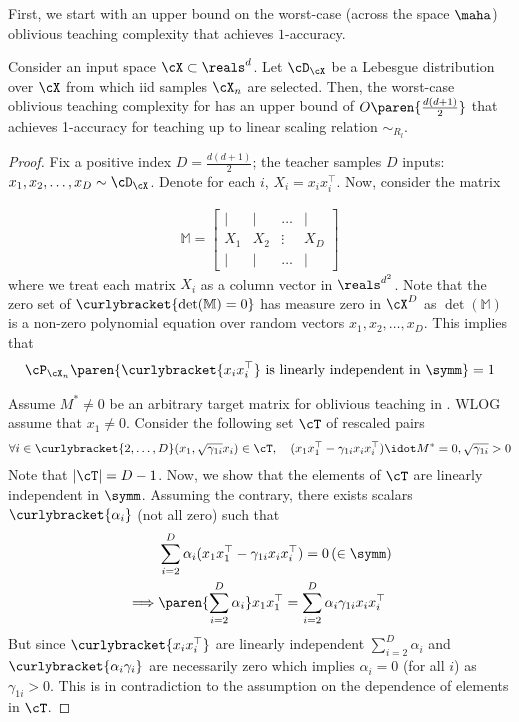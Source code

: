 First, we start with an upper bound on the worst-case (across the space $\maha$) oblivious teaching complexity that achieves $1$-accuracy.

\begin{proposition}
    Consider an input space $\cX \subset \reals^d$. Let $\cD_{\cX}$ be a Lebesgue distribution over $\cX$ from which iid samples $\cX_n$ are selected. Then, the worst-case oblivious teaching complexity for  has an upper bound of $O\paren{\frac{d(d+1)}{2}}$ that achieves 1-accuracy for teaching up to linear scaling relation $\sim_{R_l}$.
\end{proposition}
\begin{proof}
    
    Fix a positive index $D = \frac{d(d+1)}{2}$; the teacher samples $D$ inputs: $x_1,x_2,\ldots, x_{D} \sim \cD_{\cX}$. Denote for each $i$, $X_i = x_ix_i^{\top}$. Now, consider the matrix

        \begin{align*}
    \mathbb{M} = \begin{bmatrix}
  \Big\lvert & \Big\lvert& \ldots & \Big\lvert \\
  X_1 & X_2 & \vdots & X_D\\
  \Big\lvert& \Big\lvert& \ldots & \Big\lvert
\end{bmatrix}
\end{align*}
where we treat each matrix $X_i$ as a column vector in $\reals^{d^2}$. Note that the zero set of $\curlybracket{\det(\mathbb{M}) = 0}$ has measure zero in $\cX^D$ as $\det(\mathbb{M})$ is a non-zero polynomial equation over random vectors $x_1,x_2,\ldots, x_{D}$. This implies that
\begin{align}
    \cP_{\cX_n}\paren{\curlybracket{x_ix_i^{\top}} \textnormal{ is linearly independent in } \symm} = 1 \label{eq: fullprob}
\end{align}

Assume $M^* \neq 0$ be an arbitrary target matrix for oblivious teaching in . WLOG assume that $x_1 \neq 0$. Consider the following set $\cT$ of rescaled pairs
\begin{align*}
    \forall i \in \curlybracket{2,\ldots, D} (x_1, \sqrt{\gamma_{1i}}x_i) \in \cT,\quad (x_1x_1^{\top} - \gamma_{1i}x_ix_i^{\top}) \idot M^* = 0, \sqrt{\gamma_{1i}} > 0
\end{align*}
Note that $|\cT| = D - 1$. Now, we show that the elements of $\cT$ are linearly independent in $\symm$. Assuming the contrary, there exists scalars $\curlybracket{\alpha_i}$ (not all zero) such that
\begin{align*}
    &\sum_{i = 2}^D \alpha_i (x_1x_1^{\top} - \gamma_{1i}x_ix_i^{\top}) = 0 \,(\in \symm)\\
    \implies &\paren{\sum_{i = 2}^D \alpha_i} x_1x_1^{\top} = \sum_{i = 2}^D \alpha_i \gamma_{1i}x_ix_i^{\top}
\end{align*}
But since $\curlybracket{x_ix_i^{\top}}$ are linearly independent $\sum_{i = 2}^D \alpha_i$ and $\curlybracket{\alpha_i\gamma_i}$ are necessarily zero which implies $\alpha_i = 0$ (for all $i$) as $\gamma_{1i} > 0$. This is in contradiction to the assumption on the dependence of elements in $\cT$. 


\end{proof}
